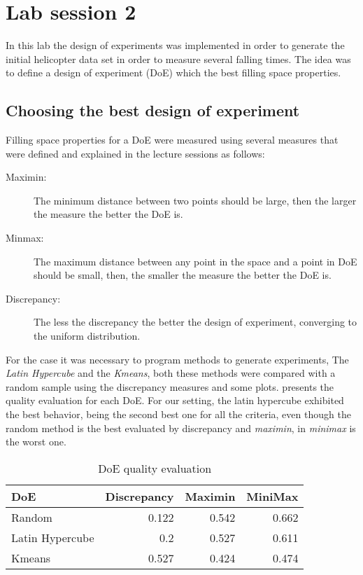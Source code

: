 \section{Lab session 2}

In this lab the design of experiments was implemented in order to generate the
initial helicopter data set in order to measure several falling times. The idea
was to define a design of experiment (DoE) which the best filling space
properties.

\subsection{Choosing the best design of experiment}
Filling space properties for a DoE were measured using several measures that
were defined and explained in the lecture sessions as follows:

\begin{description}
	\item[Maximin:] The minimum distance between two points should be large, then
	the larger the measure the better the DoE is.

	\item[Minmax:] The maximum distance between any point in the space and a point
	in DoE should be small, then, the smaller the measure the better the DoE is.

	\item[Discrepancy:] The less the discrepancy the better the design of
	experiment, converging to the uniform distribution.
\end{description}

For the case it was necessary to program methods to generate experiments, The
\emph{Latin Hypercube} and the \emph{Kmeans}, both these methods were compared
with a random sample using the discrepancy measures and some plots.
 presents the quality evaluation for each DoE. For our
setting, the latin hypercube exhibited the best behavior, being the second best
one for all the criteria, even though the random method is the best evaluated by
discrepancy and \emph{maximin}, in \emph{minimax} is the worst one.

\begin{table}[h]
	\centering
	\begin{tabular}{lrrr}
		\toprule
		DoE             & Discrepancy & Maximin & MiniMax \\
		\midrule
		Random          & 0.122       & 0.542   & 0.662 \\
		Latin Hypercube & 0.2         & 0.527   & 0.611 \\
		Kmeans          & 0.527       & 0.424   & 0.474 \\
		\bottomrule
	\end{tabular}
	\caption{DoE quality evaluation} 
	\label{tab:doe_eval} 
\end{table}

